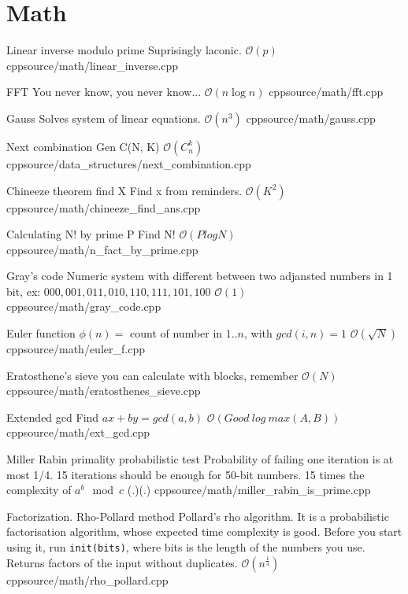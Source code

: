 \documentclass[landscape, 10pt, a4paper, oneside, twocolumn]{extarticle}
\begin{document}
\section{Math}

\Algorithm
{Linear inverse modulo prime}
{Suprisingly laconic.}
{$\mathcal{O}(p)$}
{cpp}{source/math/linear_inverse.cpp}

\Algorithm
{FFT}
{You never know, you never know...}
{$\mathcal{O}(n \log n)$}
{cpp}{source/math/fft.cpp}

\Algorithm
{Gauss}
{Solves system of linear equations.}
{$\mathcal{O}(n^{3})$}
{cpp}{source/math/gauss.cpp}

\Algorithm
{Next combination}
{Gen C(N, K)}
{$\mathcal{O}(C_{n}^{k})$}
{cpp}{source/data_structures/next_combination.cpp}

\Algorithm
{Chineeze theorem find X}
{Find x from reminders.}
{$\mathcal{O}(K^{2})$}
{cpp}{source/math/chineeze_find_ans.cpp}

\Algorithm
{Calculating N! by prime P}
{Find N!}
{$\mathcal{O}(P log N)$}
{cpp}{source/math/n_fact_by_prime.cpp}

\Algorithm
{Gray's code}
{Numeric system with different between two adjansted numbers in 1 bit, ex: $000, 001, 011, 010, 110, 111, 101, 100$}
{$\mathcal{O}(1)$}
{cpp}{source/math/gray_code.cpp}

\Algorithm
{Euler function}
{$\phi(n) = $ count of number in $1..n$, with $gcd(i, n) = 1$}
{$\mathcal{O}(\sqrt{N})$}
{cpp}{source/math/euler_f.cpp}

\Algorithm
{Eratosthene's sieve}
{you can calculate with blocks, remember}
{$\mathcal{O}(N)$}
{cpp}{source/math/eratosthenes_sieve.cpp}

\Algorithm
{Extended gcd}
{Find $a x + b y = gcd(a, b)$}
{$\mathcal{O}(Good\ log\ max(A, B))$}
{cpp}{source/math/ext_gcd.cpp}

\Algorithm
{Miller Rabin primality probabilistic test}
{Probability of failing one iteration is at most 1/4. 15 iterations should be enough for 50-bit numbers.}
{15 times the complexity of $a^b \mod c$ (.)(.)}
{cpp}{source/math/miller_rabin_is_prime.cpp}

\Algorithm
{Factorization. Rho-Pollard method}
{Pollard's rho algorithm. It is a probabilistic factorisation algorithm, whose expected time complexity is good. Before you start using it, run {\tt init(bits)}, where bits is the length of the numbers you use. Returns factors of the input without duplicates.}
{$\mathcal{O}(n^{\frac{1}{4}})$}
{cpp}{source/math/rho_pollard.cpp}
\end{document}
